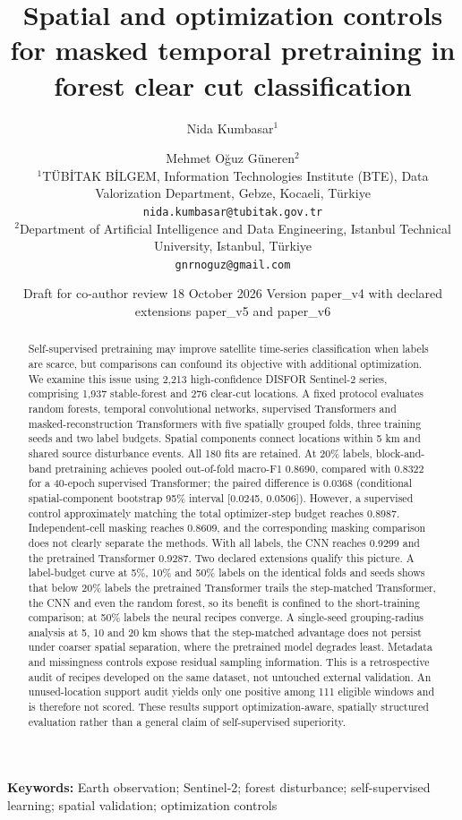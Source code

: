 \documentclass[11pt,a4paper]{article}
\title{\LARGE Spatial and optimization controls for masked temporal pretraining in forest clear cut classification}
\author{Nida Kumbasar$^{1}$ \and Mehmet Oğuz Güneren$^{2}$\\[6pt]
\small $^{1}$TÜBİTAK BİLGEM, Information Technologies Institute (BTE), Data Valorization Department, Gebze, Kocaeli, Türkiye \\
\small \texttt{nida.kumbasar@tubitak.gov.tr}\\[3pt]
\small $^{2}$Department of Artificial Intelligence and Data Engineering, Istanbul Technical University, Istanbul, Türkiye \\
\small \texttt{gnrnoguz@gmail.com}}
\date{\small Draft for co-author review \textbullet{} 18 October 2026 \textbullet{} Version paper\_v4 with declared extensions paper\_v5 and paper\_v6}
\begin{document}
\maketitle

\begin{abstract}
Self-supervised pretraining may improve satellite time-series classification when labels are scarce, but comparisons can confound its objective with additional optimization. We examine this issue using 2,213 high-confidence DISFOR Sentinel-2 series, comprising 1,937 stable-forest and 276 clear-cut locations. A fixed protocol evaluates random forests, temporal convolutional networks, supervised Transformers and masked-reconstruction Transformers with five spatially grouped folds, three training seeds and two label budgets. Spatial components connect locations within 5 km and shared source disturbance events. All 180 fits are retained. At 20\% labels, block-and-band pretraining achieves pooled out-of-fold macro-F1 0.8690, compared with 0.8322 for a 40-epoch supervised Transformer; the paired difference is 0.0368 (conditional spatial-component bootstrap 95\% interval [0.0245, 0.0506]). However, a supervised control approximately matching the total optimizer-step budget reaches 0.8987. Independent-cell masking reaches 0.8609, and the corresponding masking comparison does not clearly separate the methods. With all labels, the CNN reaches 0.9299 and the pretrained Transformer 0.9287. Two declared extensions qualify this picture. A label-budget curve at 5\%, 10\% and 50\% labels on the identical folds and seeds shows that below 20\% labels the pretrained Transformer trails the step-matched Transformer, the CNN and even the random forest, so its benefit is confined to the short-training comparison; at 50\% labels the neural recipes converge. A single-seed grouping-radius analysis at 5, 10 and 20 km shows that the step-matched advantage does not persist under coarser spatial separation, where the pretrained model degrades least. Metadata and missingness controls expose residual sampling information. This is a retrospective audit of recipes developed on the same dataset, not untouched external validation. An unused-location support audit yields only one positive among 111 eligible windows and is therefore not scored. These results support optimization-aware, spatially structured evaluation rather than a general claim of self-supervised superiority.

\end{abstract}
\noindent\textbf{Keywords:} Earth observation; Sentinel-2; forest disturbance; self-supervised learning; spatial validation; optimization controls
\end{document}
